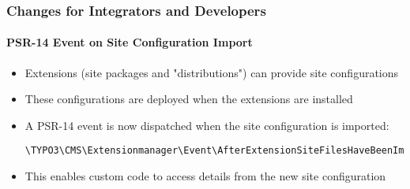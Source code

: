 %

\begin{frame}[fragile]
	\frametitle{Changes for Integrators and Developers}
	\framesubtitle{PSR-14 Event on Site Configuration Import}


	\begin{itemize}
		\item Extensions (site packages and "distributions") can provide site configurations
		\item These configurations are deployed when the extensions are installed
		\item A PSR-14 event is now dispatched when the site configuration is imported:
\begin{lstlisting}
\TYPO3\CMS\Extensionmanager\Event\AfterExtensionSiteFilesHaveBeenImportedEvent
\end{lstlisting}
		\item This enables custom code to access details from the new site configuration
	\end{itemize}
\end{frame}

